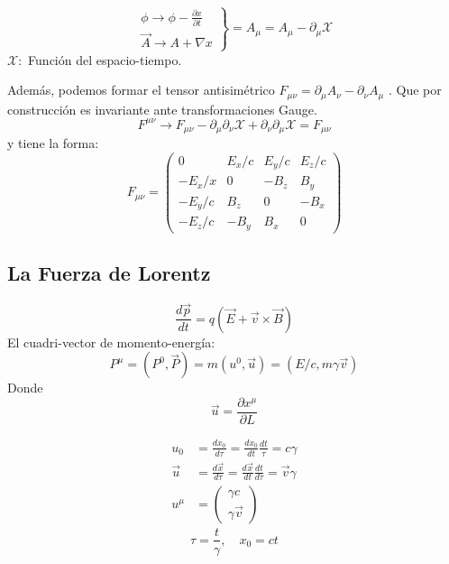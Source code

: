\documentclass[a4paper,12pt]{article}
\begin{document}
\[
\left.
\begin{array}{c}
    \phi \to \phi -\frac{\partial x}{\partial t } \\
       \Vec{A} \to A + \nabla x
\end{array} 
\right \} = A_\mu =A_\mu-\partial _\mu \mathcal{X} 
\]
$\mathcal{X:}$ Función del espacio-tiempo. 

Además, podemos formar el tensor antisimétrico $F_{\mu\nu }= \partial_\mu A_\nu - \partial_\nu A_\mu   $ .
Que por construcción es invariante ante transformaciones Gauge. 
\[
F^{\mu\nu}    \to F_{\mu   \nu} - \partial_\mu\partial_\nu \mathcal{X} +\partial_\nu \partial_\mu \mathcal{ X} = F_{\mu \nu }
\]
y tiene la forma: 
\[
F_{\mu\nu} = \begin{pmatrix}
    0&E_x/c &E_y/c&E_z/c \\
    -E_x/x &0&-B_z&B_y\\
    -E_y/c &B_z &0&-B_x\\
    -E_z/c&-B_y &B_x&0
\end{pmatrix}
\]
\subsection{La Fuerza de Lorentz} 

\[
\frac{d \Vec{p}}{dt } = q(\Vec{E}+\Vec{v}\times \Vec{B}   )
\]
El cuadri-vector de momento-energía: 
\[
P^\mu = (P^0, \Vec{P}) =m (u^0, \Vec{u} ) = (E/c, m\gamma \Vec{v})
\]
Donde 
\[
\Vec{u} = \frac{\partial x^\mu}{\partial L } 
\]

\begin{align*}
    u_0 &= \frac{d x_0}{d \tau } = \frac{d x_0 }{dt} \frac{dt}{ \tau } = c\gamma \\
    \Vec{u} &= \frac{ d \Vec{ x }}{d \tau } = \frac{d \Vec{x}}{dt  } \frac{dt}{d\tau } = \Vec{ v} \gamma \\
    u^\mu &= \begin{pmatrix}
        \gamma c \\ \gamma \Vec{ v} 
    \end{pmatrix}
\end{align*}
\[
\tau = \frac{t }{\gamma}, \quad x_0 = ct
\]
\end{document}
